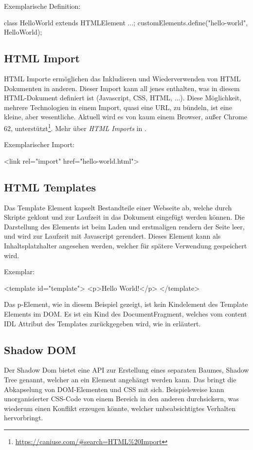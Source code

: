 Exemplarische Definition:
\begin{JsCode}
	class HelloWorld extends HTMLElement {...};
	customElements.define("hello-world", HelloWorld);
\end{JsCode}

\subsection{HTML Import}
HTML Importe ermöglichen das Inkludieren und Wiederverwenden von HTML Dokumenten in anderen. Dieser Import kann all jenes enthalten, was in diesem HTML-Dokument definiert ist (Javascript, CSS, HTML, ...). 
Diese Möglichkeit, mehrere Technologien in einem Import, quasi eine URL, zu bündeln, ist eine kleine, aber wesentliche. Aktuell wird es von kaum einem Browser, außer Chrome 62,  unterstützt\footnote{\url{https://caniuse.com/\#search=HTML\%20Import}}. Mehr über \emph{HTML Imports} in \cite{html-imports}.

Exemplarischer Import:
\begin{JsCode}
	<link rel="import" href="hello-world.html">
\end{JsCode}

\subsection{HTML Templates}
Das Template Element kapselt Bestandteile einer Webseite ab, welche durch Skripte geklont und zur Laufzeit in das Dokument eingefügt werden können. Die Darstellung des Elements ist beim Laden und erstmaligen rendern der Seite leer, und wird zur Laufzeit mit Javascript gerendert. Dieses Element kann als Inhaltsplatzhalter angesehen werden, welcher für spätere Verwendung gespeichert wird. 

Exemplar:
\begin{JsCode}
<template id="template">
	<p>Hello World!</p>
</template>
\end{JsCode}
Das p-Element, wie in diesem Beispiel gezeigt, ist kein Kindelement des Template Elements im DOM. Es ist ein Kind des DocumentFragment, welches vom content IDL Attribut des Templates zurückgegeben wird, wie in \cite{html-templates} erläutert.

\subsection{Shadow DOM}
Der Shadow Dom bietet eine API zur Erstellung eines separaten Baumes, Shadow Tree genannt, welcher an ein Element angehängt werden kann.
Das bringt die Abkapselung von DOM-Elementen und CSS mit sich. Beispielsweise kann unorganisierter CSS-Code von einem Bereich in den anderen durchsickern, was wiederum einen Konflikt erzeugen könnte, welcher unbeabsichtigtes Verhalten hervorbringt. 

